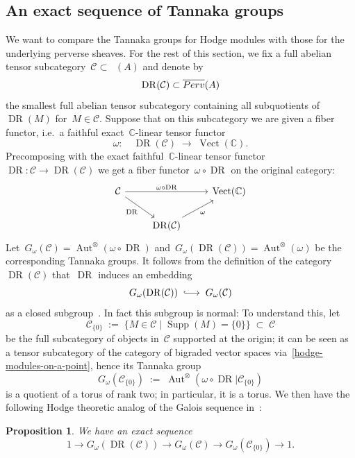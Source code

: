\documentclass[a4paper]{amsart}
\newcommand{\bbC}{\mathbb{C}}
\newcommand{\cC}{\mathcal{C}}
\newcommand{\too}{\longrightarrow}
\newcommand{\Perv}{\textup{Perv}}
\newcommand{\Pbar}{\overline{\Perv}}
\newcommand{\intoo}{\lhook\joinrel\longrightarrow}
\DeclareMathOperator{\Vect}{Vect}
\DeclareMathOperator{\Aut}{Aut}
\DeclareMathOperator{\Supp}{Supp}
\DeclareMathOperator{\DR}{DR}
\DeclareMathOperator{\HM}{HM}
\DeclareMathOperator{\Mbar}{\overline{\HM}}
\theoremstyle{plain}
\newtheorem{proposition}[theorem]{Proposition}
\theoremstyle{definition}
\numberwithin{equation}{section}
\begin{document}
\subsection{An exact sequence of Tannaka groups}  We want to compare the Tannaka groups for Hodge modules with those for the underlying perverse sheaves. For the rest of this section, we fix a full abelian tensor subcategory~$\cC \subset \Mbar(A)$ and denote by 
%
\[ \DR(\cC) \subset \Pbar(A) \]
%
the smallest full abelian tensor subcategory containing all subquotients of~$\DR(M)$ for~$M\in \cC$. Suppose that on this subcategory we are given a fiber functor, i.e.~a faithful exact~$\bbC$-linear tensor functor
%
\[
 \omega \colon \quad \DR(\cC) \;\longrightarrow\; \Vect(\bbC).
\]
%
Precomposing with the exact faithful~$\bbC$-linear tensor functor~$\DR\colon \cC \to \DR(\cC)$ we get a fiber functor~$\omega \circ \DR$ on the original category:
%
\[
\begin{tikzcd}
\cC \ar[rr, "\omega\circ \DR"] \ar[dr, swap, "\DR"] && \Vect(\bbC) \\
& \DR(\cC) \ar[ur, swap, "\omega"] & 
\end{tikzcd} 
\] 
%
Let~$G_\omega(\cC)=\Aut^\otimes(\omega \circ \DR)$ and~$G_\omega(\DR(\cC))=\Aut^\otimes(\omega)$ be the corresponding Tannaka groups. It follows from the definition of the category~$\DR(\cC)$ that~$\DR$ induces an embedding
%
\[
 G_\omega(\DR(\cC)) \;\intoo\; G_\omega(\cC)
\]
%
as a closed subgroup~\cite[prop.~2.21b]{DM82}. In fact this subgroup is normal: To understand this, let
%
\[
 \cC_{\{0\}} \;:=\; \{  M \in \cC \mid \Supp(M)=\{0\}\} \;\subset\; \cC
\]
%
be the full subcategory of objects in~$\cC$ supported at the origin; it can be seen as a tensor subcategory of the category of bigraded vector spaces via~\cref{hodge-modules-on-a-point}, hence its Tannaka group
% 
\[ G_\omega(\cC_{\{0\}}) \;:=\; \Aut^\otimes(\omega\circ \DR \vert \cC_{\{0\}}) 
\]
%
is a quotient of a torus of rank two; in particular, it is a torus.  We then have the following Hodge theoretic analog of the Galois sequence in~\cite[th.~4.3]{JKLM}:

\begin{proposition} \label{perverse-versus-hodge-sequence}
We have an exact sequence
%
\[
 1 \too G_\omega(\DR(\cC)) \too G_\omega(\cC) \too G_\omega(\cC_{\{0\}}) \too 1.
\]
%
\end{proposition}
\end{document}
